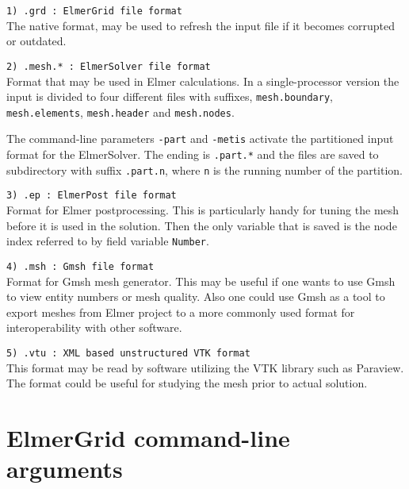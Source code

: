 \begin{description}

\item \texttt{1)  .grd     : ElmerGrid file format} \\
The native format, may be used to refresh the input file if it becomes
corrupted or outdated.

\item \texttt{2)  .mesh.*   : ElmerSolver file format} \\
Format that may be used in Elmer calculations.
In a single-processor version 
the input is divided to four different files with 
suffixes, \texttt{mesh.boundary}, \texttt{mesh.elements},
\texttt{mesh.header} and \texttt{mesh.nodes}.

The command-line parameters \texttt{-part} and \texttt{-metis} 
activate the partitioned 
input format for the ElmerSolver. 
The ending is \texttt{.part.*} and the 
files are saved to 
subdirectory with suffix \texttt{.part.n}, where
\texttt{n} is the running number of the partition.

\item \texttt{3)  .ep       : ElmerPost file format} \\
Format for Elmer postprocessing. This is particularly handy for tuning the
mesh before it is used in the solution. Then the only variable that is saved is 
the node index referred to by field variable \texttt{Number}.

\item \texttt{4)  .msh      : Gmsh file format} \\
Format for Gmsh mesh generator. This may be useful if one wants to use Gmsh to view entity numbers or mesh quality. 
Also one could use Gmsh as a tool to export meshes from Elmer project to a more commonly used format for interoperability with other software.

\item \texttt{5)  .vtu      : XML based unstructured VTK format} \\
This format may be read by software utilizing the VTK library such as Paraview. 
The format could be useful for studying the mesh prior to actual solution.



\end{description}



\section{ElmerGrid command-line arguments}

